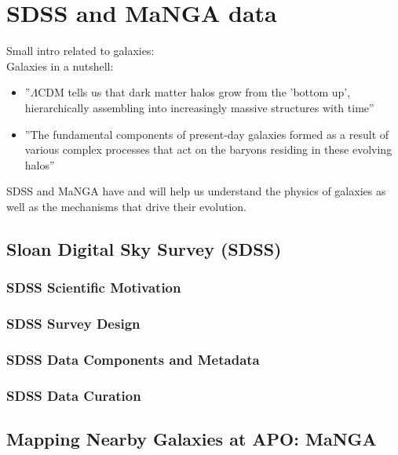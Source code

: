 \section{SDSS and MaNGA data}
Small intro related to galaxies: \\
Galaxies in a nutshell:\\

\begin{itemize}
  \item ''$\Lambda$CDM tells us that dark matter halos grow from the 'bottom up', hierarchically assembling into increasingly massive structures with time'' \citep{bundy2015}
  \item ''The fundamental components of present-day galaxies formed as a result of various complex processes that act on the baryons residing in these evolving halos'' \citep{bundy2015}
\end{itemize}

SDSS and MaNGA have and will help us understand the physics of galaxies as well as the mechanisms that drive their evolution.

\subsection{Sloan Digital Sky Survey (SDSS)}

\subsubsection{SDSS Scientific Motivation}

\subsubsection{SDSS Survey Design}

\subsubsection{SDSS Data Components and Metadata}

\subsubsection{SDSS Data Curation}

\subsection{Mapping Nearby Galaxies at APO: MaNGA}

